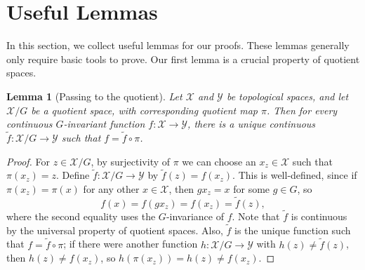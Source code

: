 \documentclass{article} \usepackage{iclr2023_conference,times}
\newcommand{\X}{\mathcal{X}}
\newcommand{\Y}{\mathcal{Y}}
\newtheorem{lemma}{Lemma}
\begin{document}
\section{Useful Lemmas}

In this section, we collect useful lemmas for our proofs. These lemmas generally only require basic tools to prove.  Our first lemma is a crucial property of quotient spaces.

\begin{lemma}[Passing to the quotient]\label{lem:pass_to_quotient}
    Let $\X$ and $\Y$ be topological spaces, and let $\X/G$ be a quotient space, with corresponding quotient map $\pi$. Then for every continuous $G$-invariant function $f: \X \to \Y$, there is a unique continuous $\tilde f: \X/G \to \Y$ such that
    $f = \tilde f \circ \pi$.
\end{lemma}
\begin{proof}
    For $z \in \X/G$, by surjectivity of $\pi$ we can choose an $x_z \in \X$ such that $\pi(x_z) = z$. Define $\tilde f: \X/G \to \Y$ by $\tilde f(z) = f(x_z)$. This is well-defined, since if $\pi(x_z) = \pi(x)$ for any other $x \in \X$, then $g x_z = x$ for some $g \in G$, so 
    \begin{equation}
        f(x) = f(gx_z) = f(x_z) = \tilde f(z),
    \end{equation}
    where the second equality uses the $G$-invariance of $f$. Note that $\tilde f$ is continuous by the universal property of quotient spaces. Also, $\tilde f$ is the  unique function such that $f = \tilde f \circ \pi$; if there were another function $h: \X/G \to \Y$ with $h(z) \neq \tilde f(z)$, then $h(z) \neq f(x_z)$, so $h(\pi(x_z)) = h(z) \neq f(x_z)$.
\end{proof}
\end{document}
